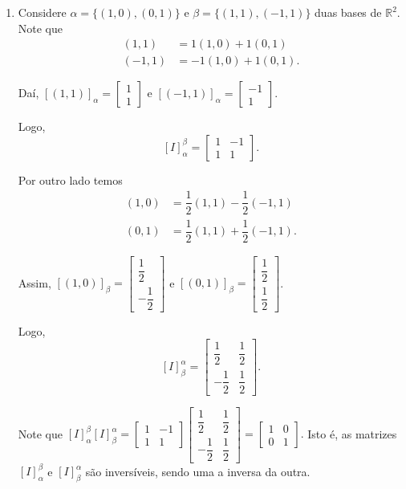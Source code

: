 \begin{enumerate}


\item Considere $\alpha=\{ (1,0), (0,1)\}$ e $\beta=\{(1,1), (-1,1) \}$ duas bases de $\mathbb{R}^2$. Note que
\begin{align*}
(1,1)&=1(1,0)+1(0,1)\\
(-1,1)&=-1(1,0) + 1(0,1).
\end{align*}

Daí, $[(1,1)]_{\alpha}=\left[\begin{array}{c}1\\1 \end{array}\right]$ e $[(-1,1)]_{\alpha}=\left[\begin{array}{c}-1\\1 \end{array}\right]$.

Logo,
$$[I]_{\alpha}^{\beta}=\left[\begin{array}{cc}1&-1\\1&1 \end{array}\right].$$

Por outro lado temos
\begin{align*}
(1,0)&=\dfrac{1}{2}(1,1)-\dfrac{1}{2}(-1,1)\\
(0,1)&=\dfrac{1}{2}(1,1) + \dfrac{1}{2}(-1,1).
\end{align*}

Assim,  $[(1,0)]_{\beta}=\left[\begin{array}{c}\dfrac{1}{2}\\-\dfrac{1}{2} \end{array}\right]$ e $[(0,1)]_{\beta}=\left[\begin{array}{c}\dfrac{1}{2}\\\dfrac{1}{2} \end{array}\right]$.

Logo,
$$[I]_{\beta}^{\alpha}=\left[\begin{array}{cc}\dfrac{1}{2}&\dfrac{1}{2}\\-\dfrac{1}{2}&\dfrac{1}{2}\end{array}\right].$$


Note que $[I]_{\alpha}^{\beta}[I]_{\beta}^{\alpha}=\left[\begin{array}{cc}1&-1\\1&1 \end{array}\right]\left[\begin{array}{cc}\dfrac{1}{2}&\dfrac{1}{2}\\-\dfrac{1}{2}&\dfrac{1}{2}\end{array}\right]=\left[\begin{array}{cc}1&0\\0&1 \end{array}\right].$ Isto é, as matrizes $[I]_{\alpha}^{\beta}$ e $[I]_{\beta}^{\alpha}$ são inversíveis, sendo uma a inversa da outra.



\end{enumerate}
